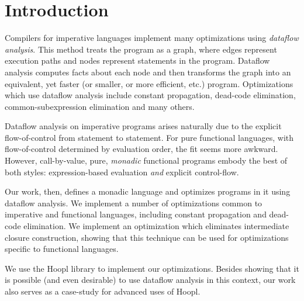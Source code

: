 \documentclass[12pt]{report}
\begin{document}


\chapter{Introduction}

Compilers for imperative languages implement many optimizations using
\emph{dataflow analysis}. This method treats the program as a graph,
where edges represent execution paths and nodes represent statements
in the program. Dataflow analysis computes facts about each node and
then transforms the graph into an equivalent, yet faster (or smaller,
or more efficient, etc.) program. Optimizations which use dataflow
analysis include constant propagation, dead-code elimination,
common-subexpression elimination and many others.

Dataflow analysis on imperative programs arises naturally due to the
explicit flow-of-control from statement to statement. For pure
functional languages, with flow-of-control determined by evaluation
order, the fit seems more awkward. However, call-by-value, pure,
\emph{monadic} functional programs embody the best of both
styles: expression-based evaluation \emph{and} explicit
control-flow. 

Our work, then, defines a monadic language and optimizes programs in
it using dataflow analysis. We implement a number of optimizations
common to imperative and functional languages, including constant
propagation and dead-code elimination. We implement an optimization
which eliminates intermediate closure construction, showing that this
technique can be used for optimizations specific to functional
languages. %

We use the Hoopl library \citep{Hoopl-3.8.7.0} to implement our
optimizations. Besides showing that it is possible (and even
desirable) to use dataflow analysis in this context, our work also
serves as a case-study for advanced uses of Hoopl.
\end{document}

